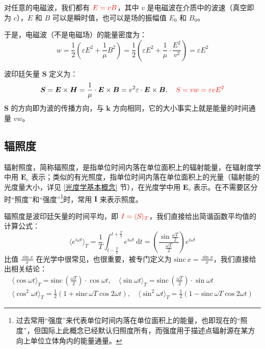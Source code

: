 \documentclass[UTF8]{report}
\def\sinc{\mathrm{sinc}\,}
\theoremstyle{MyLineTheoremStyle} %
\theoremstyle{MyBlockTheoremStyle} %
\theoremstyle{MySubsubsectionStyle} %
\begin{document}
对任意的电磁波，我们都有 $\displaystyle {\color{red} E = vB}$，其中 $v$ 是电磁波在介质中的波速（真空即为 $c$），$E$ 和 $B$ 可以是瞬时值，也可以是场的振幅值 $E_0$ 和 $B_0$。

于是，电磁波（不是电磁场）的能量密度为：
\begin{equation}
    w = \frac{1}{2}\left( \varepsilon E^2 + \frac{1}{\mu}B^2 \right) =  \frac{1}{2}\left( \varepsilon E^2 + \frac{1}{\mu}\cdot \frac{E^2}{v^2} \right) = \varepsilon E^2
\end{equation}



波印廷矢量 $\boldsymbol{S}$ 定义为：
\begin{equation}
\boldsymbol{S}
= \boldsymbol{E} \times \boldsymbol{H} 
= \frac{1}{\mu} \cdot\boldsymbol{E} \times \boldsymbol{B} 
= v^2 \varepsilon \cdot \boldsymbol{E} \times \boldsymbol{B},\quad {\color{red} S = vw = \varepsilon v E^2}
\end{equation}
$\boldsymbol{S}$ 的方向即为波的传播方向，与 $\boldsymbol{k}$ 方向相同，它的大小事实上就是能量的时间通量 $vw$。
\subsection{辐照度}

辐射照度，简称辐照度，是指单位时间内落在单位面积上的辐射能量，在辐射度学中用 $\boldsymbol{E}_e$ 表示；类似的有光照度，指单位时间内落在单位面积上的光量（辐射能的光度量大小，详见 \ref{光度学基本概念} 节），在光度学中用 $\boldsymbol{E}_v$ 表示。在不需要区分时“照度”和“强度”\footnote{过去常用“强度”来代表单位时间内落在单位面积上的能量，也即现在的“照度”，但国际上此概念已经默认归照度所有，而强度用于描述点辐射源在某方向上单位立体角内的能量通量。}时，常用 $\boldsymbol{I}$ 来表示照度。

辐照度是波印廷矢量的时间平均，即 ${\color{red} I = \langle S  \rangle_T}$，我们直接给出简谐函数平均值的计算公式：
\begin{equation}
\langle e^{i \omega t} \rangle_T = \frac{1}{T}\int_{t - \frac{T}{2}}^{t + \frac{T}{2}} e^{i \omega t} \ \mathrm{d}t = \left(\frac{\sin \frac{\omega T}{2}}{\frac{\omega T}{2}}\right)e^{i \omega t}
\end{equation}
比值 $\frac{\sin x}{x}$ 在光学中很常见，也很重要，被专门定义为 $\sinc x = \frac{\sin x}{x}$，我们直接给出相关结论：
\begin{gather}
    \langle \cos \omega t \rangle_T  = \sinc \left(\frac{\omega T}{2}  \right)\cdot \cos \omega t, \quad \langle \sin \omega t \rangle_T  = \sinc \left(\frac{\omega T}{2} \right)\cdot \sin \omega t \\ 
    \langle \cos^2 \omega t \rangle_T  = \frac{1}{2}\left(1 + \sinc \omega T  \cos 2 \omega t\right), \quad \langle \sin^2 \omega t \rangle_T  = \frac{1}{2}\left(1 - \sinc \omega T  \cos 2 \omega t\right)
\end{gather}
\end{document}
